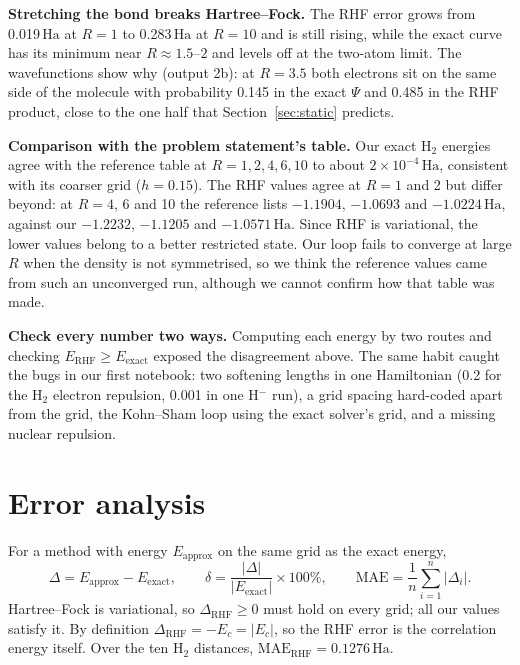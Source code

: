 \documentclass[11pt,a4paper]{article}
\newcommand{\Ha}{\ensuremath{\,\mathrm{Ha}}}
\begin{document}
\begin{insight}
\textbf{Stretching the bond breaks Hartree--Fock.} The RHF error grows from 0.019\Ha{} at $R=1$ to 0.283\Ha{} at
$R=10$ and is still rising, while the exact curve has its minimum near $R\approx1.5$--$2$ and levels off at the
two-atom limit. The wavefunctions show why (output 2b): at $R=3.5$ both electrons sit on the same side of the
molecule with probability 0.145 in the exact $\Psi$ and 0.485 in the RHF product, close to the one half that
Section~\ref{sec:static} predicts.
\end{insight}

\textbf{Comparison with the problem statement's table.} Our exact H$_2$ energies agree with the reference table at
$R=1,2,4,6,10$ to about $2\times10^{-4}$\Ha, consistent with its coarser grid ($h=0.15$). The RHF values agree at $R=1$
and 2 but differ beyond: at $R=4$, 6 and 10 the reference lists $-1.1904$, $-1.0693$ and $-1.0224$\Ha, against our
$-1.2232$, $-1.1205$ and $-1.0571$\Ha. Since RHF is variational, the lower values belong to a better restricted
state. Our loop fails to converge at large $R$ when the density is not symmetrised, so we think the reference
values came from such an unconverged run, although we cannot confirm how that table was made.

\begin{insight}
\textbf{Check every number two ways.} Computing each energy by two routes and checking $E_\text{RHF}\ge E_\text{exact}$
exposed the disagreement above. The same habit caught the bugs in our first notebook: two softening lengths in
one Hamiltonian (0.2 for the H$_2$ electron repulsion, 0.001 in one H$^-$ run), a grid spacing hard-coded apart from
the grid, the Kohn--Sham loop using the exact solver's grid, and a missing nuclear repulsion.
\end{insight}

\section{Error analysis}

For a method with energy $E_\text{approx}$ on the same grid as the exact energy,
\begin{equation}
  \Delta=E_\text{approx}-E_\text{exact},\qquad \delta=\frac{|\Delta|}{|E_\text{exact}|}\times100\%,\qquad
  \text{MAE}=\frac1n\sum_{i=1}^n|\Delta_i|.
\end{equation}
Hartree--Fock is variational, so $\Delta_\text{RHF}\ge0$ must hold on every grid; all our values satisfy it. By definition
$\Delta_\text{RHF}=-E_c=|E_c|$, so the RHF error is the correlation energy itself. Over the ten H$_2$ distances,
$\text{MAE}_\text{RHF}=0.1276$\Ha.
\end{document}
